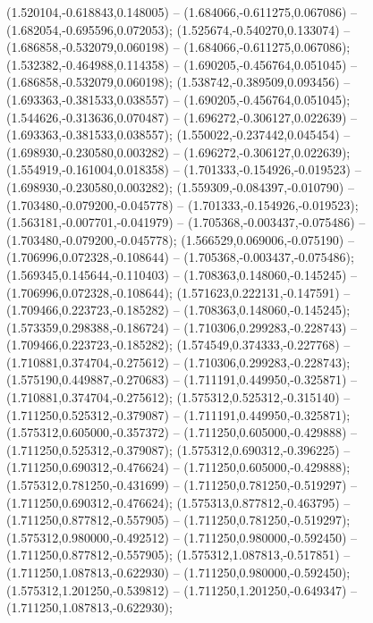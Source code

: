  (1.520104,-0.618843,0.148005) -- (1.684066,-0.611275,0.067086) -- (1.682054,-0.695596,0.072053);
 (1.525674,-0.540270,0.133074) -- (1.686858,-0.532079,0.060198) -- (1.684066,-0.611275,0.067086);
 (1.532382,-0.464988,0.114358) -- (1.690205,-0.456764,0.051045) -- (1.686858,-0.532079,0.060198);
 (1.538742,-0.389509,0.093456) -- (1.693363,-0.381533,0.038557) -- (1.690205,-0.456764,0.051045);
 (1.544626,-0.313636,0.070487) -- (1.696272,-0.306127,0.022639) -- (1.693363,-0.381533,0.038557);
 (1.550022,-0.237442,0.045454) -- (1.698930,-0.230580,0.003282) -- (1.696272,-0.306127,0.022639);
 (1.554919,-0.161004,0.018358) -- (1.701333,-0.154926,-0.019523) -- (1.698930,-0.230580,0.003282);
 (1.559309,-0.084397,-0.010790) -- (1.703480,-0.079200,-0.045778) -- (1.701333,-0.154926,-0.019523);
 (1.563181,-0.007701,-0.041979) -- (1.705368,-0.003437,-0.075486) -- (1.703480,-0.079200,-0.045778);
 (1.566529,0.069006,-0.075190) -- (1.706996,0.072328,-0.108644) -- (1.705368,-0.003437,-0.075486);
 (1.569345,0.145644,-0.110403) -- (1.708363,0.148060,-0.145245) -- (1.706996,0.072328,-0.108644);
 (1.571623,0.222131,-0.147591) -- (1.709466,0.223723,-0.185282) -- (1.708363,0.148060,-0.145245);
 (1.573359,0.298388,-0.186724) -- (1.710306,0.299283,-0.228743) -- (1.709466,0.223723,-0.185282);
 (1.574549,0.374333,-0.227768) -- (1.710881,0.374704,-0.275612) -- (1.710306,0.299283,-0.228743);
 (1.575190,0.449887,-0.270683) -- (1.711191,0.449950,-0.325871) -- (1.710881,0.374704,-0.275612);
 (1.575312,0.525312,-0.315140) -- (1.711250,0.525312,-0.379087) -- (1.711191,0.449950,-0.325871);
 (1.575312,0.605000,-0.357372) -- (1.711250,0.605000,-0.429888) -- (1.711250,0.525312,-0.379087);
 (1.575312,0.690312,-0.396225) -- (1.711250,0.690312,-0.476624) -- (1.711250,0.605000,-0.429888);
 (1.575312,0.781250,-0.431699) -- (1.711250,0.781250,-0.519297) -- (1.711250,0.690312,-0.476624);
 (1.575313,0.877812,-0.463795) -- (1.711250,0.877812,-0.557905) -- (1.711250,0.781250,-0.519297);
 (1.575312,0.980000,-0.492512) -- (1.711250,0.980000,-0.592450) -- (1.711250,0.877812,-0.557905);
 (1.575312,1.087813,-0.517851) -- (1.711250,1.087813,-0.622930) -- (1.711250,0.980000,-0.592450);
 (1.575312,1.201250,-0.539812) -- (1.711250,1.201250,-0.649347) -- (1.711250,1.087813,-0.622930);
